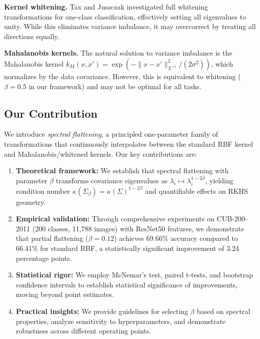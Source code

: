 \documentclass[11pt]{article}
\begin{document}
\textbf{Kernel whitening.} Tax and Juszczak \cite{tax2002kernel} investigated full whitening transformations for one-class classification, effectively setting all eigenvalues to unity. While this eliminates variance imbalance, it may overcorrect by treating all directions equally.

\textbf{Mahalanobis kernels.} The natural solution to variance imbalance is the Mahalanobis kernel $k_M(x,x') = \exp(-\|x-x'\|^2_{\Sigma^{-1}}/(2\sigma^2))$, which normalizes by the data covariance. However, this is equivalent to whitening ($\beta=0.5$ in our framework) and may not be optimal for all tasks.

\subsection{Our Contribution}

We introduce \emph{spectral flattening}, a principled one-parameter family of transformations that continuously interpolates between the standard RBF kernel and Mahalanobis/whitened kernels. Our key contributions are:

\begin{enumerate}
    \item \textbf{Theoretical framework:} We establish that spectral flattening with parameter $\beta$ transforms covariance eigenvalues as $\lambda_i \mapsto \lambda_i^{1-2\beta}$, yielding condition number $\kappa(\Sigma_\beta) = \kappa(\Sigma)^{1-2\beta}$ and quantifiable effects on RKHS geometry.
    
    \item \textbf{Empirical validation:} Through comprehensive experiments on CUB-200-2011 (200 classes, 11,788 images) with ResNet50 features, we demonstrate that partial flattening ($\beta = 0.12$) achieves 69.66\% accuracy compared to 66.41\% for standard RBF, a statistically significant improvement of 3.24 percentage points.
    
    \item \textbf{Statistical rigor:} We employ McNemar's test, paired t-tests, and bootstrap confidence intervals to establish statistical significance of improvements, moving beyond point estimates.
    
    \item \textbf{Practical insights:} We provide guidelines for selecting $\beta$ based on spectral properties, analyze sensitivity to hyperparameters, and demonstrate robustness across different operating points.
\end{enumerate}
\end{document}
